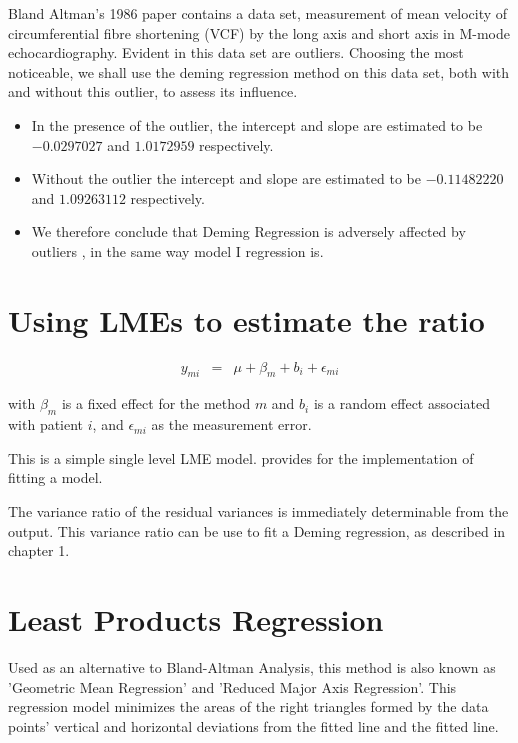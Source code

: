 \documentclass[12pt, a4paper]{report}
\theoremstyle{plain}
\theoremstyle{definition}
\theoremstyle{remark}
\begin{document}
Bland Altman's 1986 paper contains a data set, measurement of mean velocity of circumferential fibre shortening (VCF) by the long axis and short axis in M-mode echocardiography. Evident in this data set are outliers. Choosing the most noticeable, we shall use the deming regression method on this data set, both with and
without this outlier, to assess its influence.
\begin{itemize}
	\item In the presence of the outlier, the intercept and slope are estimated to be $-0.0297027$ and $1.0172959$ respectively.
	\item Without the outlier the intercept and slope are estimated to be
	$-0.11482220$ and  $1.09263112$ respectively.
	\item We therefore conclude that Deming Regression is adversely affected
	by outliers , in the same way model I regression is.
\end{itemize}





\section{Using LMEs to estimate the ratio}

\begin{eqnarray*}
	y_{mi} &=& \mu + \beta_{m} + b_{i} + \epsilon_{mi}
\end{eqnarray*}

with $\beta_{m}$ is a fixed effect for the method $m$ and $b_{i}$
is a random effect associated with patient $i$, and
$\epsilon_{mi}$ as the measurement error.

This is a simple single level LME model. \citet{pb} provides for
the implementation of fitting a model.

The variance ratio of the residual variances is immediately
determinable from the output. This variance ratio can be use to
fit a Deming regression, as described in chapter 1.




\section{Least Products Regression}
Used as an alternative to Bland-Altman Analysis, this method is also known as 'Geometric Mean Regression' and 'Reduced Major Axis Regression'. This regression model minimizes the areas of the right triangles formed by the data points' vertical and horizontal deviations from the fitted line and the fitted line.
\end{document}

